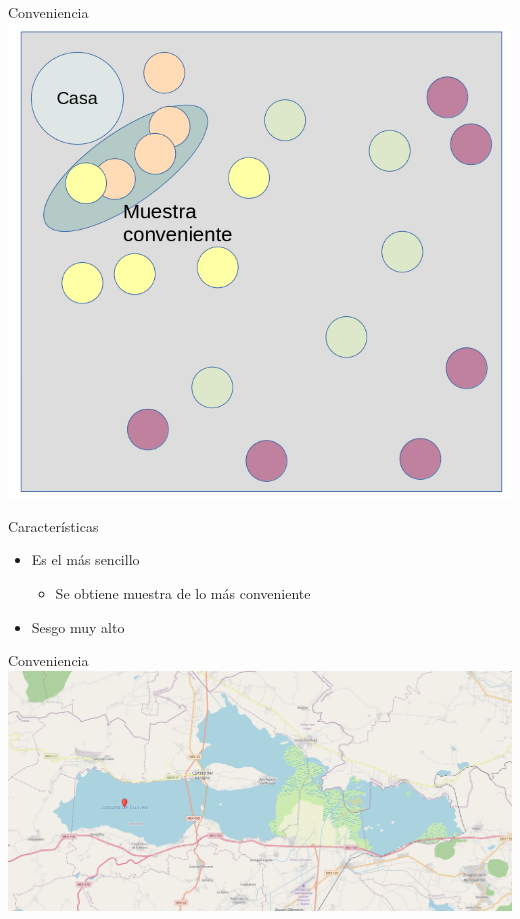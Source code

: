 \documentclass[
  11pt,
  ignorenonframetext,
]{beamer}
\providecommand{\tightlist}{%
  \setlength{\itemsep}{0pt}\setlength{\parskip}{0pt}}
\begin{document}
\begin{frame}{Conveniencia}
\protect\hypertarget{conveniencia}{}
\includegraphics{Figuras-tecnicas/Conveniencia.png}
\end{frame}

\begin{frame}{Características}
\protect\hypertarget{caracteruxedsticas-2}{}
\begin{itemize}
\item
  Es el más sencillo

  \begin{itemize}
  \tightlist
  \item
    Se obtiene muestra de lo más conveniente
  \end{itemize}
\item
  Sesgo muy alto
\end{itemize}
\end{frame}

\begin{frame}{Conveniencia}
\protect\hypertarget{conveniencia-1}{}
\includegraphics{Figuras-tecnicas/Cuitzeo.png}
\end{frame}
\end{document}

